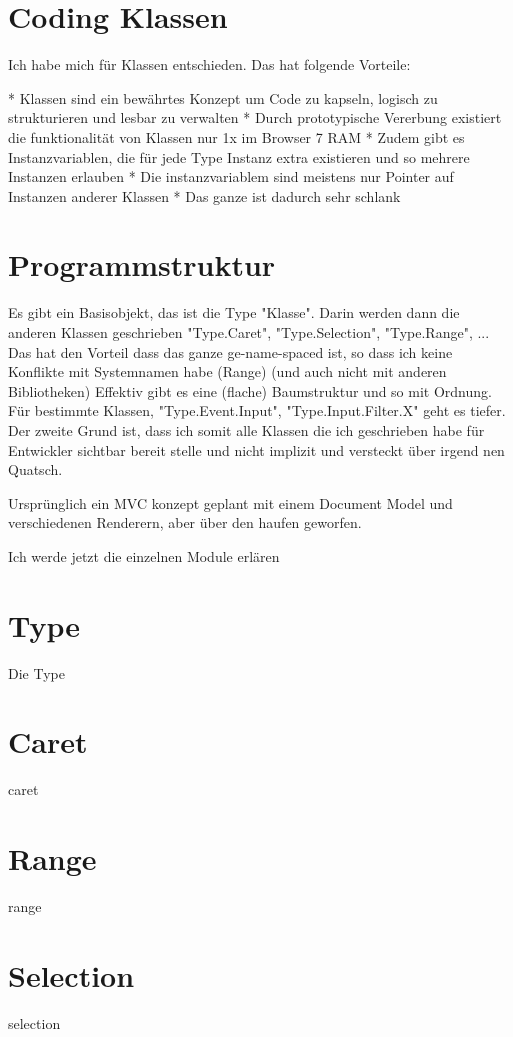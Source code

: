 \section{Coding Klassen}

Ich habe mich für Klassen entschieden. Das hat folgende Vorteile:

* Klassen sind ein bewährtes Konzept um Code zu kapseln, logisch zu strukturieren und lesbar zu verwalten
* Durch prototypische Vererbung existiert die funktionalität von Klassen nur 1x im Browser 7 RAM
* Zudem gibt es Instanzvariablen, die für jede Type Instanz extra existieren und so mehrere Instanzen erlauben
* Die instanzvariablem sind meistens nur Pointer auf Instanzen anderer Klassen
* Das ganze ist dadurch sehr schlank

\section{Programmstruktur}

Es gibt ein Basisobjekt, das ist die Type "Klasse".
Darin werden dann die anderen Klassen geschrieben "Type.Caret", "Type.Selection", "Type.Range", ...
Das hat den Vorteil dass das ganze ge-name-spaced ist, so dass ich keine Konflikte mit Systemnamen habe (Range) (und auch nicht mit anderen Bibliotheken)
Effektiv gibt es eine (flache) Baumstruktur und so mit Ordnung. Für bestimmte Klassen, "Type.Event.Input", "Type.Input.Filter.X" geht es tiefer.
Der zweite Grund ist, dass ich somit alle Klassen die ich geschrieben habe für Entwickler sichtbar bereit stelle und nicht implizit und versteckt über irgend nen Quatsch.

Ursprünglich ein MVC konzept geplant mit einem Document Model und verschiedenen Renderern, aber über den haufen geworfen.

Ich werde jetzt die einzelnen Module erlären


\section{Type}

Die Type

\section{Caret}
caret
\section{Range}
range
\section{Selection}
selection
